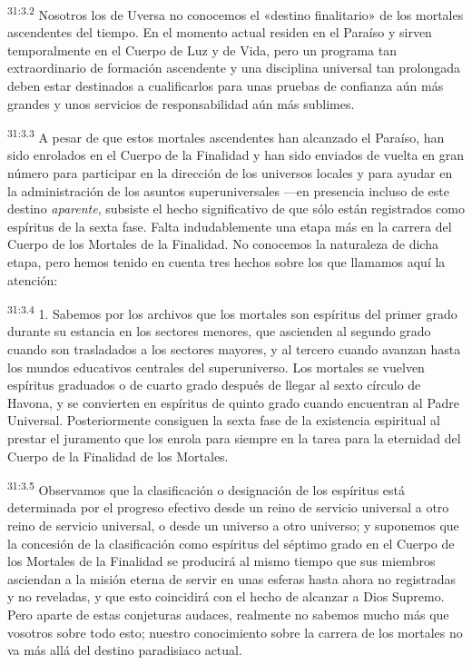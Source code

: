 \par
\textsuperscript{31:3.2} Nosotros los de Uversa no conocemos el «destino finalitario» de los mortales ascendentes del tiempo. En el momento actual residen en el Paraíso y sirven temporalmente en el Cuerpo de Luz y de Vida, pero un programa tan extraordinario de formación ascendente y una disciplina universal tan prolongada deben estar destinados a cualificarlos para unas pruebas de confianza aún más grandes y unos servicios de responsabilidad aún más sublimes.

\par
\textsuperscript{31:3.3} A pesar de que estos mortales ascendentes han alcanzado el Paraíso, han sido enrolados en el Cuerpo de la Finalidad y han sido enviados de vuelta en gran número para participar en la dirección de los universos locales y para ayudar en la administración de los asuntos superuniversales ---en presencia incluso de este destino \textit{aparente}, subsiste el hecho significativo de que sólo están registrados como espíritus de la sexta fase. Falta indudablemente una etapa más en la carrera del Cuerpo de los Mortales de la Finalidad. No conocemos la naturaleza de dicha etapa, pero hemos tenido en cuenta tres hechos sobre los que llamamos aquí la atención:

\par
\textsuperscript{31:3.4} 1. Sabemos por los archivos que los mortales son espíritus del primer grado durante su estancia en los sectores menores, que ascienden al segundo grado cuando son trasladados a los sectores mayores, y al tercero cuando avanzan hasta los mundos educativos centrales del superuniverso. Los mortales se vuelven espíritus graduados o de cuarto grado después de llegar al sexto círculo de Havona, y se convierten en espíritus de quinto grado cuando encuentran al Padre Universal. Posteriormente consiguen la sexta fase de la existencia espiritual al prestar el juramento que los enrola para siempre en la tarea para la eternidad del Cuerpo de la Finalidad de los Mortales.

\par
\textsuperscript{31:3.5} Observamos que la clasificación o designación de los espíritus está determinada por el progreso efectivo desde un reino de servicio universal a otro reino de servicio universal, o desde un universo a otro universo; y suponemos que la concesión de la clasificación como espíritus del séptimo grado en el Cuerpo de los Mortales de la Finalidad se producirá al mismo tiempo que sus miembros asciendan a la misión eterna de servir en unas esferas hasta ahora no registradas y no reveladas, y que esto coincidirá con el hecho de alcanzar a Dios Supremo. Pero aparte de estas conjeturas audaces, realmente no sabemos mucho más que vosotros sobre todo esto; nuestro conocimiento sobre la carrera de los mortales no va más allá del destino paradisiaco actual.

